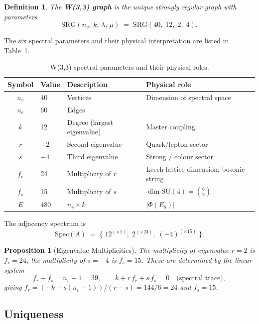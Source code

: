 \documentclass[12pt,a4paper]{article}
\newtheorem{proposition}[theorem]{Proposition}
\newtheorem{definition}[theorem]{Definition}
\newcommand{\SRG}{\mathrm{SRG}}
\newcommand{\Eone}{E_8}
\newcommand{\nv}{n_{\!v}}
\newcommand{\nelec}{n_{\!e}}
\newcommand{\fr}{f_{\!r}}
\newcommand{\fs}{f_{\!s}}
\begin{document}
\begin{definition}
The \textbf{W(3,3) graph} is the unique strongly regular graph with
parameters
\[
  \SRG(\nv,\,k,\,\lambda,\,\mu)
  \;=\;
  \SRG(40,\;12,\;2,\;4).
\]
\end{definition}

The six spectral parameters and their physical interpretation are
listed in Table~\ref{tab:params}.

\begin{table}[H]
\centering
\caption{W(3,3) spectral parameters and their physical roles.}
\label{tab:params}
\renewcommand{\arraystretch}{1.25}
\begin{tabular}{@{}clll@{}}
\toprule
Symbol & Value & Description & Physical role \\
\midrule
$\nv$ & 40 & Vertices & Dimension of spectral space \\
$\nelec$ & 60 & Edges & \\
$k$ & 12 & Degree (largest eigenvalue) & Master coupling \\
$r$ & $+2$ & Second eigenvalue & Quark/lepton sector \\
$s$ & $-4$ & Third eigenvalue & Strong / colour sector \\
$\fr$ & 24 & Multiplicity of $r$ & Leech-lattice dimension; bosonic string \\
$\fs$ & 15 & Multiplicity of $s$ & $\dim\mathrm{SU}(4)=\binom{6}{2}$ \\
$E$ & 480 & $\nv\times k$ & $|\Phi(\Eone)|$ \\
\bottomrule
\end{tabular}
\end{table}

The adjacency spectrum is
\[
  \mathrm{Spec}(A) \;=\;
  \bigl\{\; 12^{(\times 1)},\; 2^{(\times 24)},\; (-4)^{(\times 15)} \;\bigr\}.
\]

\begin{proposition}[Eigenvalue Multiplicities]
\label{prop:multiplicities}
The multiplicity of eigenvalue $r=2$ is $\fr = 24$; the multiplicity of
$s=-4$ is $\fs = 15$.  These are determined by the linear system
\[
  \fr + \fs = \nv - 1 = 39, \qquad
  k + r\,\fr + s\,\fs = 0 \quad \text{(spectral trace)},
\]
giving $\fr = (-k - s(\nv-1))/(r-s) = 144/6 = 24$ and $\fs = 15$.
\end{proposition}

\subsection{Uniqueness}
\end{document}
